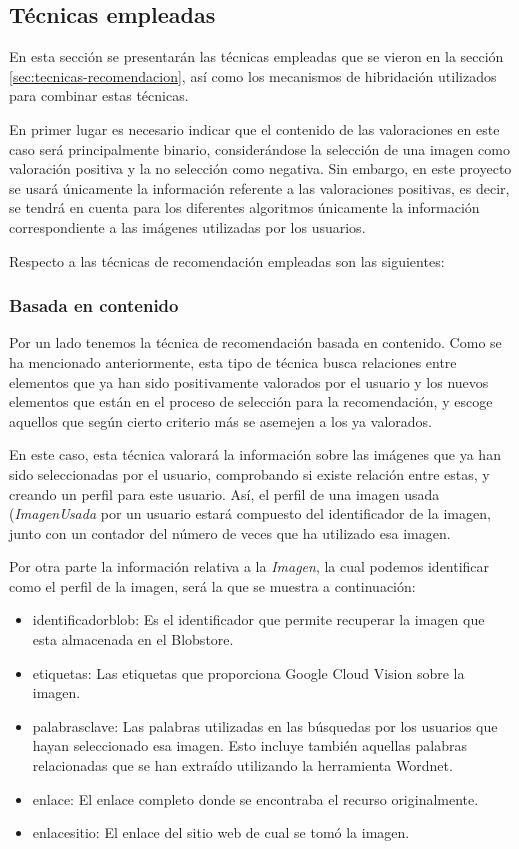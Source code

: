 \subsection{Técnicas empleadas}
En esta sección se presentarán las técnicas empleadas que se vieron en la sección \ref{sec:tecnicas-recomendacion}, así como los mecanismos de hibridación utilizados para combinar estas técnicas.

En primer lugar es necesario indicar que el contenido de las valoraciones en este caso será principalmente binario, considerándose la selección de una imagen como valoración positiva y la no selección como negativa. Sin embargo, en este proyecto se usará únicamente la información referente a las valoraciones positivas, es decir, se tendrá en cuenta para los diferentes algoritmos únicamente la información correspondiente a las imágenes utilizadas por los usuarios.

Respecto a las técnicas de recomendación empleadas son las siguientes:\\

\subsubsection{Basada en contenido}


Por un lado tenemos la técnica de recomendación basada en contenido. Como se ha mencionado anteriormente, esta tipo de técnica busca relaciones entre elementos que ya han sido positivamente valorados por el usuario y los nuevos elementos que están en el proceso de selección para la recomendación, y escoge aquellos que según cierto criterio más se asemejen a los ya valorados.

En este caso, esta técnica valorará la información sobre las imágenes que ya han sido seleccionadas por el usuario, comprobando si existe relación entre estas, y creando un perfil para este usuario. Así, el perfil de una imagen usada (\textit{ImagenUsada} por un usuario estará compuesto del identificador de la imagen, junto con un contador del número de veces que ha utilizado esa imagen. 

Por otra parte la información relativa a la \textit{Imagen}, la cual podemos identificar como el perfil de la imagen, será la que se muestra a continuación:

\begin{itemize}
\item identificador\textunderscore blob: Es el identificador que permite recuperar la imagen que esta almacenada en el Blobstore.
\item etiquetas: Las etiquetas que proporciona Google Cloud Vision sobre la imagen.
\item palabras\textunderscore clave: Las palabras utilizadas en las búsquedas por los usuarios que hayan seleccionado esa imagen. Esto incluye también aquellas palabras relacionadas que se han extraído utilizando la herramienta Wordnet.
\item enlace: El enlace completo donde se encontraba el recurso originalmente.
\item enlace\textunderscore sitio: El enlace del sitio web de cual se tomó la imagen.
\end{itemize}


